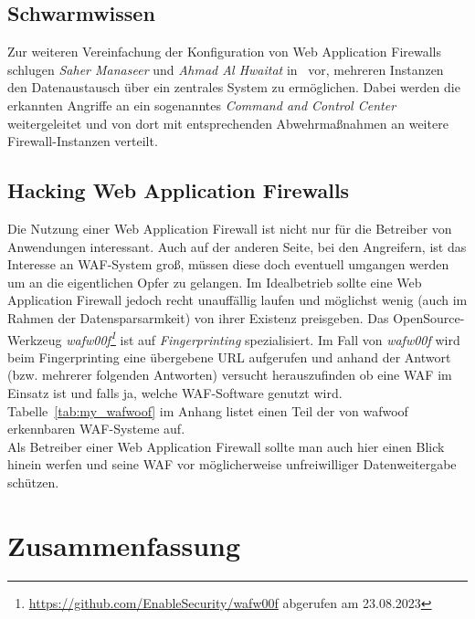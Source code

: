 \subsection{Schwarmwissen}
Zur weiteren Vereinfachung der Konfiguration von Web Application Firewalls schlugen \emph{Saher Manaseer} und \emph{Ahmad Al Hwaitat} in~\cite{Manaseer2018} vor, mehreren Instanzen den Datenaustausch über ein zentrales System zu ermöglichen. Dabei werden die erkannten Angriffe an ein sogenanntes \emph{Command and Control Center} weitergeleitet und von dort mit entsprechenden Abwehrmaßnahmen an weitere Firewall-Instanzen verteilt. 




\subsection{Hacking Web Application Firewalls}

Die Nutzung einer Web Application Firewall ist nicht nur für die Betreiber von Anwendungen interessant. Auch auf der anderen Seite, bei den Angreifern, ist das Interesse an WAF-System groß, müssen diese doch eventuell umgangen werden um an die eigentlichen Opfer zu gelangen. Im Idealbetrieb sollte eine Web Application Firewall jedoch recht unauffällig laufen und möglichst wenig (auch im Rahmen der Datensparsarmkeit) von ihrer Existenz preisgeben. Das OpenSource-Werkzeug \emph{wafw00f\footnote{\url{https://github.com/EnableSecurity/wafw00f} abgerufen am 23.08.2023}} ist auf \emph{Fingerprinting} spezialisiert. Im Fall von \emph{wafw00f} wird beim Fingerprinting eine übergebene URL aufgerufen und anhand der Antwort (bzw. mehrerer folgenden Antworten) versucht herauszufinden ob eine WAF im Einsatz ist und falls ja, welche WAF-Software genutzt wird.\\ Tabelle~\ref{tab:my_wafwoof} im Anhang listet einen Teil der von wafwoof erkennbaren WAF-Systeme auf.\\ Als Betreiber einer Web Application Firewall sollte man auch hier einen Blick hinein werfen und seine WAF vor möglicherweise unfreiwilliger Datenweitergabe schützen. 

\section{Zusammenfassung}

